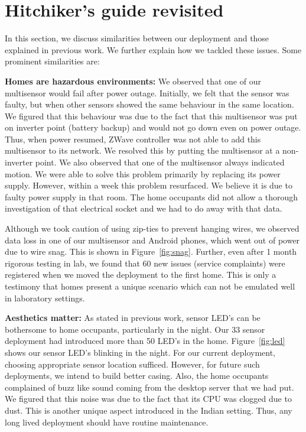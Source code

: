 \documentclass[10pt]{sensys-proc}
\newcommand{\figref}[1]{Figure~\ref{#1}}
\begin{document}
\section{Hitchiker's guide revisited}
In this section, we discuss similarities between our deployment and those explained in previous work. We further explain how we tackled these issues. Some prominent similarities are:

\noindent \textbf{Homes are hazardous environments:} We observed that one of our multisensor would fail after power outage. Initially, we felt that the sensor was faulty, but when other sensors showed the same behaviour in the same location. We figured that this behaviour was due to the fact that this multisensor was put on inverter point (battery backup) and would not go down even on power outage. Thus, when power resumed, ZWave controller was not able to add this multisensor to its network. We resolved this by putting the multisensor at a non-inverter point. We also observed that one of the multisensor always indicated motion. We were able to solve this problem primarily by replacing its power supply. However, within a week this problem resurfaced. We believe it is due to faulty power supply in that room. The home occupants did not allow a thorough investigation of that electrical socket and we had to do away with that data.

\noindent Although we took caution of using zip-ties to prevent hanging wires, we observed data loss in one of our multisensor and Android phones, which went out of power due to wire snag. This is shown in \figref{fig:snag}. Further, even after 1 month rigorous testing in lab, we found that 60 new issues (service complaints) were registered when we moved the deployment to the first home. This is only a testimony that homes present a unique scenario which can not be emulated well in laboratory settings.

\noindent \textbf{Aesthetics matter:} As stated in previous work, sensor LED's can be bothersome to home occupants, particularly in the night. Our 33 sensor deployment had introduced more than 50 LED's in the home. \figref{fig:led} shows our sensor LED's blinking in the night. For our current deployment, choosing appropriate sensor location sufficed. However, for future such deployments, we intend to build better casing. Also, the home occupants complained of buzz like sound coming from the desktop server that we had put. We figured that this noise was due to the fact that its CPU was clogged due to dust. This is another unique aspect introduced in the Indian setting. Thus, any long lived deployment should have routine maintenance.
\end{document}
